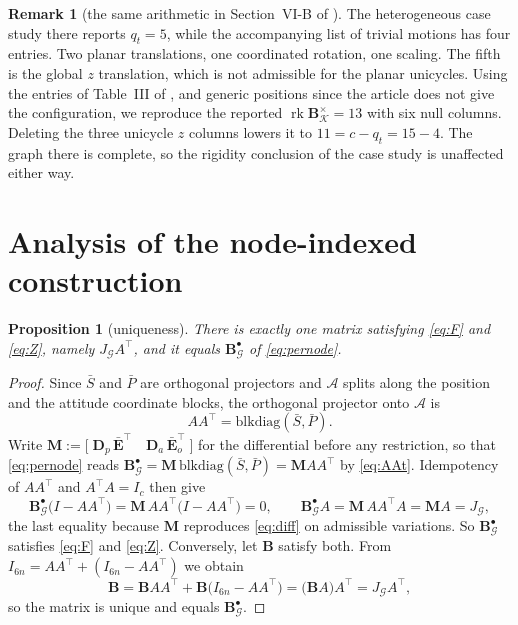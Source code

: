 \documentclass[11pt,a4paper]{article}
\theoremstyle{plain}
\newtheorem{proposition}{Proposition}
\theoremstyle{definition}
\newtheorem{remark}{Remark}
\newcommand{\rank}{\operatorname{rk}}
\newcommand{\Bper}{\mathbf{B}^{\times}}
\newcommand{\Bnode}{\mathbf{B}^{\bullet}}
\newcommand{\Ebar}{\bar{\mathbf{E}}}
\newcommand{\Ebaro}{\bar{\mathbf{E}}_o}
\newcommand{\Dp}{\mathbf{D}_p}
\newcommand{\Da}{\mathbf{D}_a}
\begin{document}
\begin{remark}[the same arithmetic in Section~VI-B of \cite{michieletto2021}]
The heterogeneous case study there reports $q_t=5$, while the accompanying list
of trivial motions has four entries. Two planar translations, one coordinated
rotation, one scaling. The fifth is the global $z$ translation, which is not admissible
for the planar unicycles. Using the entries of Table~III of
\cite{michieletto2021}, and generic positions since the article does not give
the configuration, we reproduce the reported
$\rank\Bper_{\mathcal K}=13$ with six null columns. Deleting the three
unicycle $z$ columns lowers it to $11=c-q_t=15-4$. The graph there is complete,
so the rigidity conclusion of the case study is unaffected either way.
\end{remark}

\section{Analysis of the node-indexed construction}

\begin{proposition}[uniqueness]\label{prop:unique}
There is exactly one matrix satisfying \eqref{eq:F} and \eqref{eq:Z}, namely
$J_{\mathcal G}A^\top$, and it equals $\Bnode_{\mathcal G}$ of
\eqref{eq:pernode}.
\end{proposition}

\begin{proof}
Since $\bar S$ and $\bar P$ are orthogonal projectors and $\mathcal A$ splits
along the position and the attitude coordinate blocks, the orthogonal projector
onto $\mathcal A$ is
\begin{equation}\label{eq:AAt}
  AA^\top=\mathrm{blkdiag}(\bar S,\bar P).
\end{equation}
Write $\mathbf M:=\bigl[\;\Dp\,\Ebar^\top\quad\Da\,\Ebaro^\top\;\bigr]$ for the
differential before any restriction, so that \eqref{eq:pernode} reads
$\Bnode_{\mathcal G}=\mathbf M\,\mathrm{blkdiag}(\bar S,\bar P)=\mathbf M
AA^\top$ by \eqref{eq:AAt}. Idempotency of $AA^\top$ and $A^\top A=I_c$ then
give
\begin{equation*}
  \Bnode_{\mathcal G}\bigl(I-AA^\top\bigr)
  =\mathbf M\,AA^\top\bigl(I-AA^\top\bigr)=0,
  \qquad
  \Bnode_{\mathcal G}A=\mathbf M\,AA^\top A=\mathbf M A=J_{\mathcal G},
\end{equation*}
the last equality because $\mathbf M$ reproduces \eqref{eq:diff} on admissible
variations. So $\Bnode_{\mathcal G}$ satisfies \eqref{eq:F} and \eqref{eq:Z}.
Conversely, let $\mathbf B$ satisfy both. From
$I_{6n}=AA^\top+(I_{6n}-AA^\top)$ we obtain
\begin{equation*}
  \mathbf B=\mathbf BAA^\top+\mathbf B\bigl(I_{6n}-AA^\top\bigr)
  =\bigl(\mathbf BA\bigr)A^\top=J_{\mathcal G}A^\top ,
\end{equation*}
so the matrix is unique and equals $\Bnode_{\mathcal G}$.
\end{proof}
\end{document}
